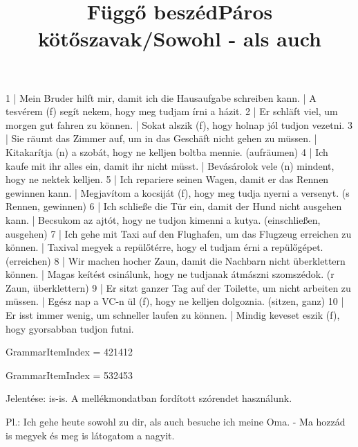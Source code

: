 \begin{exmp}
1 | Mein Bruder hilft mir, damit ich die Hausaufgabe schreiben kann. | A tesvérem (f) segít nekem, hogy meg tudjam írni a házit.
2 | Er schläft viel, um morgen gut fahren zu können. | Sokat alszik (f), hogy holnap jól tudjon vezetni.
3 | Sie räumt das Zimmer auf, um in das Geschäft nicht gehen zu müssen. | Kitakarítja (n) a szobát, hogy ne kelljen boltba mennie. (aufräumen)
4 | Ich kaufe mit ihr alles ein, damit ihr nicht müsst. | Bevásárolok vele (n) mindent, hogy ne nektek kelljen.
5 | Ich repariere seinen Wagen, damit er das Rennen gewinnen kann. | Megjavítom a kocsiját (f), hogy meg tudja nyerni a versenyt. (s Rennen, gewinnen)
6 | Ich schließe die Tür ein, damit der Hund nicht ausgehen kann. | Becsukom az ajtót, hogy ne tudjon kimenni a kutya. (einschließen, ausgehen)
7 | Ich gehe mit Taxi auf den Flughafen, um das Flugzeug erreichen zu können. | Taxival megyek a repülőtérre, hogy el tudjam érni a repülőgépet. (erreichen)
8 | Wir machen hocher Zaun, damit die Nachbarn nicht überklettern können. | Magas keítést csinálunk, hogy ne tudjanak átmászni szomszédok. (r Zaun, überklettern)
9 | Er sitzt ganzer Tag auf der Toilette, um nicht arbeiten zu müssen. | Egész nap a VC-n ül (f), hogy ne kelljen dolgoznia. (sitzen, ganz)
10 | Er isst immer wenig, um schneller laufen zu können. | Mindig keveset eszik (f), hogy gyorsabban tudjon futni.
\end{exmp}

\title{Függő beszéd}

GrammarItemIndex = 421412

\begin{desc}
\end{desc}

\begin{exmp}
\end{exmp}

\title{Páros kötőszavak/Sowohl - als auch}

GrammarItemIndex = 532453

\begin{desc}
Jelentése: is-is.
A mellékmondatban fordított szórendet használunk.

Pl.: Ich gehe heute sowohl zu dir, als auch besuche ich meine Oma. - Ma hozzád is megyek és meg is látogatom a nagyit. 
\end{desc}

